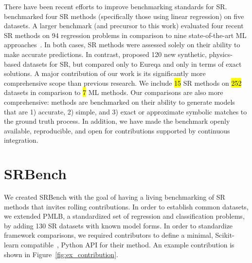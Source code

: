 There have been recent efforts to improve benchmarking standards for SR.
\citet{zegklitzBenchmarkingStateoftheartSymbolic2020} benchmarked four SR methods (specifically those using linear regression) on five datasets. 
A larger benchmark (and precursor to this work) evaluated four recent SR methods on 94 regression problems in comparison to nine state-of-the-art ML approaches~\cite{orzechowskiWhereAreWe2018}. 
In both cases, SR methods were assessed solely on their ability to make accurate predictions. 
In contrast, \citet{udrescuAIFeynmanPhysicsInspired2020} proposed 120 new synthetic, physics-based datasets for SR, but compared only to Eureqa and only in terms of exact solutions. 
A major contribution of our work is its significantly more comprehensive scope than previous research.
We include \hl{15} SR methods on \hl{252} datasets in comparison to \hl{7} ML methods. 
Our comparisons are also more comprehensive: methods are benchmarked on their ability to generate models that are 1) accurate, 2) simple, and 3) exact or approximate symbolic matches to the ground truth process. 
In addition, we have made the benchmark openly available, reproducible, and open for contributions supported by continuous integration. 





\section{SRBench}

We created SRBench with the goal of having a living benchmarking of SR methods that invites rolling contributions. 
In order to establish common datasets, we extended PMLB, a standardized set of regression and classification problems\cite{olsonPMLBLargeBenchmark2017d}, by adding 130 SR datasets with known model forms. 
In order to standardize framework comparisons, we required contributors to define a minimal, Scikit-learn compatible~\cite{pedregosaScikitlearnMachineLearning2011a}, Python API for their method. 
An example contribution is shown in Figure~\ref{fig:ex_contribution}.

